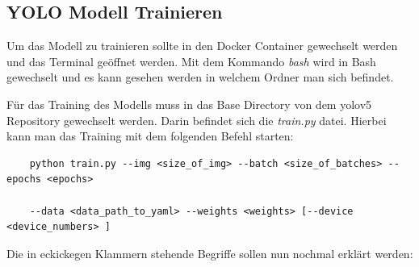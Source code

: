 \subsection{YOLO Modell Trainieren}
\label{sec:yolo_train}
Um das Modell zu trainieren sollte in den Docker Container gewechselt werden und das Terminal geöffnet werden. Mit dem Kommando \textit{bash} wird in Bash gewechselt und es kann gesehen werden in welchem Ordner man sich befindet. 

Für das Training des Modells muss in das  Base Directory von dem \ac{yolo}v5 Repository gewechselt werden. Darin befindet sich die \textit{train.py} datei. Hierbei kann man das Training mit dem folgenden Befehl starten:
\begin{verbatim}
    python train.py --img <size_of_img> --batch <size_of_batches> --epochs <epochs>
    
    --data <data_path_to_yaml> --weights <weights> [--device <device_numbers> ]
\end{verbatim}
Die in eckickegen Klammern stehende Begriffe sollen nun nochmal erklärt werden:
